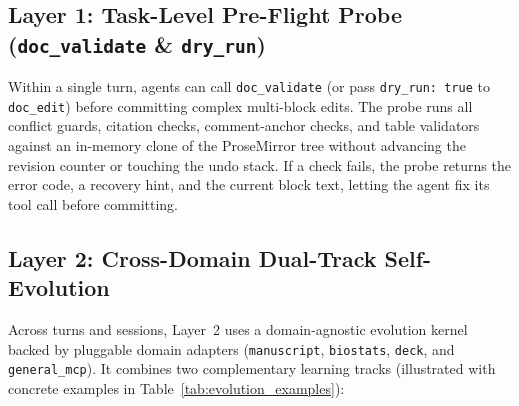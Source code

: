 \documentclass[11pt,a4paper]{article}
\begin{document}
\subsection{Layer 1: Task-Level Pre-Flight Probe (\texttt{doc\_validate} \& \texttt{dry\_run})}
Within a single turn, agents can call \texttt{doc\_validate} (or pass \texttt{dry\_run: true} to \texttt{doc\_edit}) before committing complex multi-block edits. The probe runs all conflict guards, citation checks, comment-anchor checks, and table validators against an in-memory clone of the ProseMirror tree without advancing the revision counter or touching the undo stack. If a check fails, the probe returns the error code, a recovery hint, and the current block text, letting the agent fix its tool call before committing.

\subsection{Layer 2: Cross-Domain Dual-Track Self-Evolution}
Across turns and sessions, Layer~2 uses a domain-agnostic evolution kernel backed by pluggable domain adapters (\texttt{manuscript}, \texttt{biostats}, \texttt{deck}, and \texttt{general\_mcp}). It combines two complementary learning tracks (illustrated with concrete examples in Table~\ref{tab:evolution_examples}):
\end{document}
